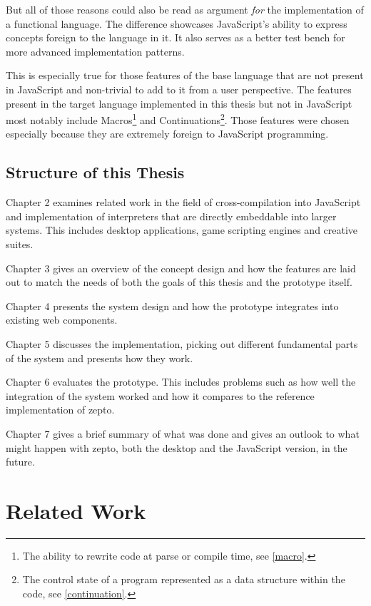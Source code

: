 \documentclass[oneside,11pt,xetex]{scrbook}
\begin{document}
But all of those reasons could also be read as argument \textit{for} the implementation
of a functional language. The difference showcases JavaScript's ability
to express concepts foreign to the language in it. It also serves as a better
test bench for more advanced implementation patterns.

This is especially true for those features of the base language that are not
present in JavaScript and non-trivial to add to it from a user perspective.
The features present in the target language implemented in this thesis but not
in JavaScript most notably include Macros\footnote{The ability to rewrite
code at parse or compile time, see \ref{macro}.} and Continuations\footnote{The
control state of a program represented as a data structure within the code, see
\ref{continuation}.}. Those features were chosen especially because they are
extremely foreign to JavaScript programming.

\section{Structure of this Thesis}

Chapter 2 examines related work in the field of cross-compilation into JavaScript and implementation
of interpreters that are directly embeddable into larger systems. This includes desktop applications,
game scripting engines and creative suites.

Chapter 3 gives an overview of the concept design and how the features are laid out to match the needs
of both the goals of this thesis and the prototype itself.

Chapter 4 presents the system design and how the prototype integrates into existing web components.

Chapter 5 discusses the implementation, picking out different fundamental parts of the system and
presents how they work.

Chapter 6 evaluates the prototype. This includes problems such as how well the integration of the
system worked and how it compares to the reference implementation of zepto.

Chapter 7 gives a brief summary of what was done and gives an outlook to what might happen with
zepto, both the desktop and the JavaScript version, in the future.

\chapter{Related Work}
\label{chap:RelatedWork}
\end{document}
